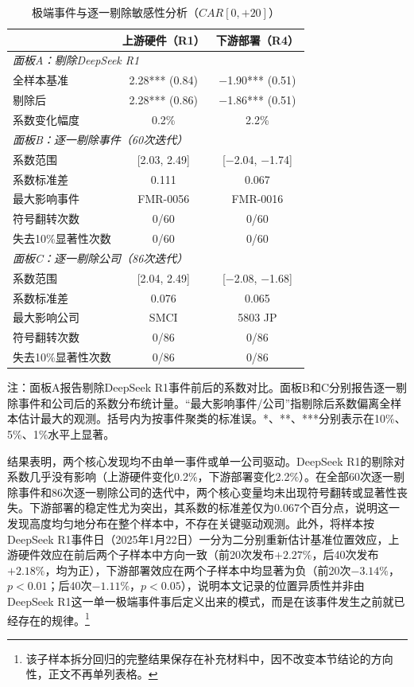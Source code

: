 \documentclass[11pt,fontset=fandol,a4paper]{ctexart}
\newcommand{\changed}[1]{{\color{orange!85!black}#1}}
\begin{document}
\begin{table}[H]
\centering
\small
\begin{threeparttable}
\caption{极端事件与逐一剔除敏感性分析（$CAR[0,+20]$）}
\label{tab:r3_sensitivity}
\begin{tabular}{lcc}
\toprule
 & 上游硬件（R1） & 下游部署（R4） \\
\midrule
\multicolumn{3}{l}{\textit{面板A：剔除DeepSeek R1}} \\
\quad 全样本基准 & 2.28*** (0.84) & $-$1.90*** (0.51) \\
\quad 剔除后 & 2.28*** (0.86) & $-$1.86*** (0.51) \\
\quad 系数变化幅度 & 0.2\% & 2.2\% \\[6pt]
\multicolumn{3}{l}{\textit{面板B：逐一剔除事件（60次迭代）}} \\
\quad 系数范围 & [2.03, 2.49] & [$-$2.04, $-$1.74] \\
\quad 系数标准差 & 0.111 & 0.067 \\
\quad 最大影响事件 & FMR-0056 & FMR-0016 \\
\quad 符号翻转次数 & 0/60 & 0/60 \\
\quad 失去10\%显著性次数 & 0/60 & 0/60 \\[6pt]
\multicolumn{3}{l}{\textit{面板C：逐一剔除公司（86次迭代）}} \\
\quad 系数范围 & [2.04, 2.49] & [$-$2.08, $-$1.68] \\
\quad 系数标准差 & 0.076 & 0.065 \\
\quad 最大影响公司 & SMCI & 5803 JP \\
\quad 符号翻转次数 & 0/86 & 0/86 \\
\quad 失去10\%显著性次数 & 0/86 & 0/86 \\
\bottomrule
\end{tabular}
\begin{tablenotes}
\footnotesize
\item \changed{注：面板A报告剔除DeepSeek R1事件前后的系数对比。面板B和C分别报告逐一剔除事件和公司后的系数分布统计量。“最大影响事件/公司”指剔除后系数偏离全样本估计最大的观测。括号内为按事件聚类的标准误。*、**、***分别表示在10\%、5\%、1\%水平上显著。}
\end{tablenotes}
\end{threeparttable}
\end{table}

结果表明，两个核心发现均不由单一事件或单一公司驱动。DeepSeek R1的剔除对系数几乎没有影响（上游硬件变化0.2\%，下游部署变化2.2\%）。在全部60次逐一剔除事件和86次逐一剔除公司的迭代中，两个核心变量均未出现符号翻转或显著性丧失。下游部署的稳定性尤为突出，其系数的标准差仅为0.067个百分点，说明这一发现高度均匀地分布在整个样本中，不存在关键驱动观测。此外，将样本按DeepSeek R1事件日（2025年1月22日）一分为二分别重新估计基准位置效应，上游硬件效应在前后两个子样本中方向一致（前20次发布$+2.27\%$，后40次发布$+2.18\%$，均为正），下游部署效应在两个子样本中均显著为负（前20次$-3.14\%$，$p<0.01$；后40次$-1.11\%$，$p<0.05$），说明本文记录的位置异质性并非由DeepSeek R1这一单一极端事件事后定义出来的模式，而是在该事件发生之前就已经存在的规律。\footnote{该子样本拆分回归的完整结果保存在补充材料中，因不改变本节结论的方向性，正文不再单列表格。}
\end{document}
